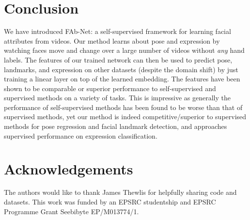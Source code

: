 \documentclass{bmvc2k}
\def\networkname{FAb-Net}
\begin{document}
\section{Conclusion}
We have introduced \networkname: a self-supervised framework for learning facial attributes from videos.
Our method learns about pose and expression by watching faces move and change over a large number of videos without {\em any} hand labels.
The features of our trained network can then be used to predict pose, landmarks, and expression on other datasets (despite the domain shift) by just training a linear layer on top of the learned embedding.
The features have been shown to be comparable or superior performance to self-supervised and supervised methods on a variety of tasks.
This is impressive as generally the performance of self-supervised methods has been found to be worse than that of supervised methods, yet our method is indeed competitive/superior to supervised methods for pose regression and facial landmark detection, and approaches supervised performance on expression classification.




\section{Acknowledgements}
The authors would like to thank James Thewlis for helpfully sharing code and datasets.
This work was funded by an EPSRC studentship and EPSRC Programme
Grant Seebibyte EP/M013774/1.



\end{document}
